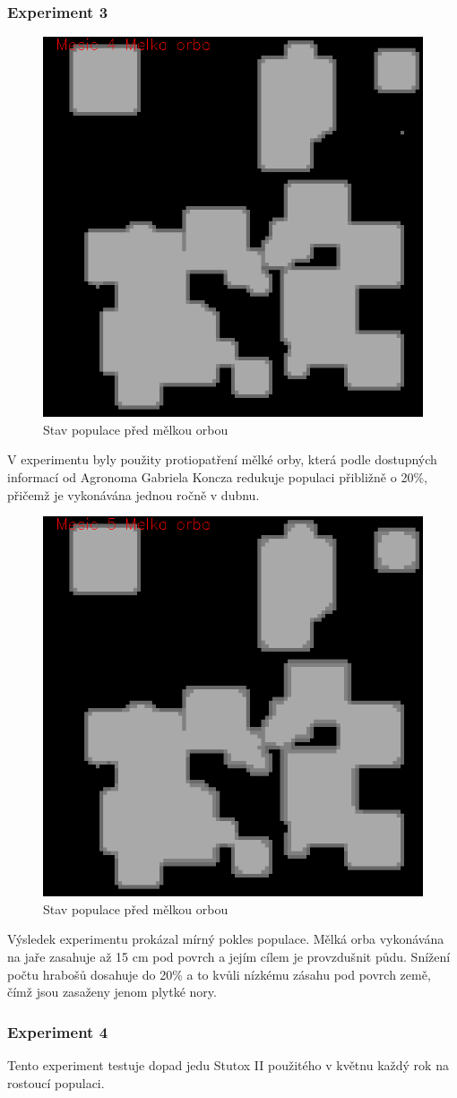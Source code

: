 \documentclass[a4paper,11pt]{article}
\begin{document}
\subsubsection{Experiment 3}
\begin{figure}[h]
\begin{center}
    \includegraphics[width=.4\linewidth]{melka_orba4.png}
    \caption{Stav populace před mělkou orbou}
    \label{exp3_obr1}
\end{center}
\end{figure}
V experimentu byly použity protiopatření mělké orby, která podle dostupných informací od Agronoma Gabriela Koncza redukuje populaci přibližně o 20\%, přičemž je vykonávána jednou ročně v dubnu. 

\begin{figure}[h]
\begin{center}
    \includegraphics[width=.4\linewidth]{melka_orba5.png}
    \caption{Stav populace před mělkou orbou}
    \label{exp3_obr2}
\end{center}
\end{figure}

Výsledek experimentu prokázal mírný pokles populace. Mělká orba vykonávána na jaře zasahuje až 15 cm pod povrch a jejím cílem je provzdušnit půdu. Snížení počtu hrabošů dosahuje do 20\% a to kvůli nízkému zásahu pod povrch země, čímž jsou zasaženy jenom plytké nory. 

\newpage
\subsubsection{Experiment 4}
Tento experiment testuje dopad jedu Stutox II použitého v květnu každý rok na rostoucí populaci.
\end{document}
